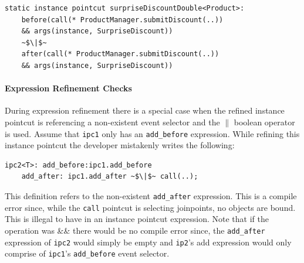 \documentclass[10pt]{sigplanconf}
\newcommand{\lstinln}[1]{\lstinline~#1~}
\begin{document}
\begin{lstlisting}[float=h!, moreemph=instance, caption={Adding the same object before and after the same join-point}, label={lst:objversion}]
static instance pointcut surpriseDiscountDouble<Product>:
	before(call(* ProductManager.submitDiscount(..))
	&& args(instance, SurpriseDiscount))
	~$\|$~
	after(call(* ProductManager.submitDiscount(..))
	&& args(instance, SurpriseDiscount))
\end{lstlisting}

\paragraph*{Expression Refinement Checks}During expression refinement there is a special case when the refined instance pointcut is referencing a non-existent event selector and the $\|$ boolean operator is used.  Assume that \lstinln{ipc1} only has an \lstinln{add_before} expression. While refining this instance pointcut the developer mistakenly writes the following:

\begin{lstlisting}
ipc2<T>: add_before:ipc1.add_before
	add_after: ipc1.add_after ~$\|$~ call(..);
\end{lstlisting}

This definition refers to the non-existent \lstinln{add_after} expression. This is a compile error since, while the \lstinln{call} pointcut is selecting joinpoints, no objects are bound.  This is illegal to have in an instance pointcut expression. Note that if the operation was \&\& there would be no compile error since, the \lstinln{add_after} expression of \lstinln{ipc2} would simply be empty and \lstinln{ip2}'s add expression would only comprise of \lstinln{ipc1}'s \lstinln{add_before} event selector.
\end{document}
